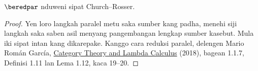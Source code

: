 \documentclass[../../../include/open-logic-section]{subfiles}
\begin{document}
\begin{thm}
  $\beredpar$ nduweni
  sipat Church--Rosser.
\end{thm}

\begin{proof}
  Yen loro langkah paralel metu saka sumber kang padha,  menehi siji langkah saka saben asil menyang pangembangan lengkap sumber kasebut. Mula iki sipat intan kang dikarepake. Kanggo cara reduksi paralel, delengen Mario Román García, \href{https://www.its.caltech.edu/~matilde/LambdaCalculusCategoryTheory.pdf}{Category Theory and Lambda Calculus} (2018), bagean 1.1.7, Definisi 1.11 lan Lema 1.12, kaca 19--20.
\end{proof}
\end{document}
